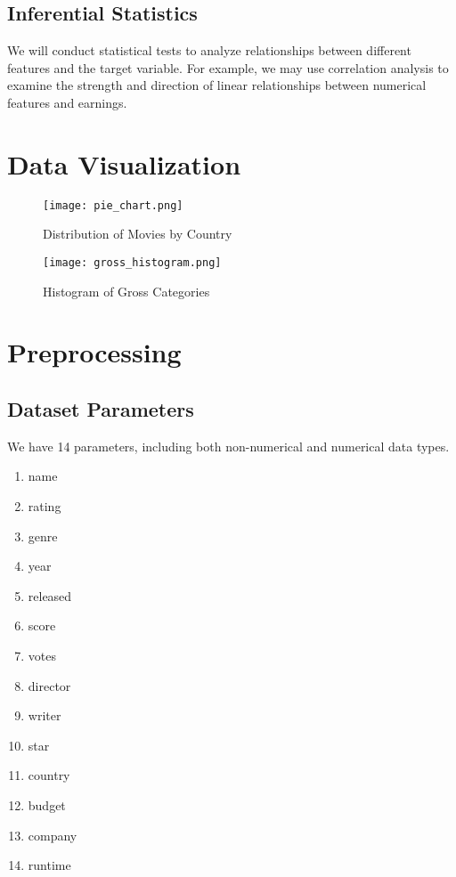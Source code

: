 \documentclass[conference]{IEEEtran}
\begin{document}
    \subsection{Inferential Statistics}
        We will conduct statistical tests to analyze relationships between different features and the target variable. For example, we may use correlation analysis to examine the strength and direction of linear relationships between numerical features and earnings.

    \section{Data Visualization}
    \begin{figure}[H]
        \centering
        \texttt{[image: pie\_chart.png]}
        \caption{Distribution of Movies by Country}
        \label{fig:country-pie-chart}
    \end{figure}

    \begin{figure}[H]
        \centering
        \texttt{[image: gross\_histogram.png]}
        \caption{Histogram of Gross Categories}
        \label{fig:gross-histogram}
    \end{figure}

\section{Preprocessing}
    \subsection{Dataset Parameters}
        We have 14 parameters, including both non-numerical and numerical data types.

        \begin{enumerate}
            \item name
            \item rating
            \item genre
            \item year
            \item released
            \item score
            \item votes
            \item director
            \item writer
            \item star
            \item country
            \item budget
            \item company
            \item runtime
        \end{enumerate}
\end{document}
